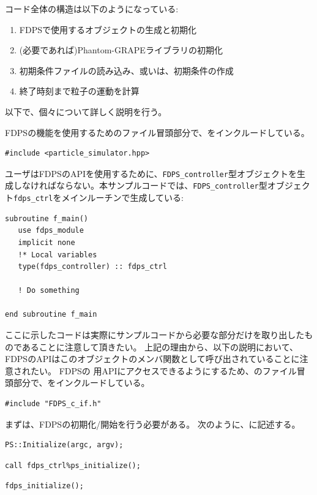 コード全体の構造は以下のようになっている:
\begin{enumerate}[leftmargin=*,itemsep=-1ex,label=(\arabic*)]
\item FDPSで使用するオブジェクトの生成と初期化
\item (必要であれば)Phantom-GRAPEライブラリの初期化
\item 初期条件ファイルの読み込み、或いは、初期条件の作成
\item 終了時刻まで粒子の運動を計算
\end{enumerate}

以下で、個々について詳しく説明を行う。

\ifCpp %
FDPSの機能を使用するためのファイル冒頭部分で、をインクルードしている。
\begin{lstlisting}[caption=FDPSのヘッダーファイルのインクルード]
#include <particle_simulator.hpp>
\end{lstlisting}
\endifCpp
\ifFtn %
ユーザはFDPSのAPIを使用するために、\texttt{FDPS\_controller}型オブジェクトを生成しなければならない。本サンプルコードでは、\texttt{FDPS\_controller}型オブジェクト\texttt{fdps\_ctrl}をメインルーチンで生成している:
\begin{lstlisting}[caption=\texttt{fdps\_controller}型オブジェクトの生成]
subroutine f_main()
   use fdps_module
   implicit none
   !* Local variables
   type(fdps_controller) :: fdps_ctrl
    
   ! Do something
   
end subroutine f_main    
\end{lstlisting}
ここに示したコードは実際にサンプルコードから必要な部分だけを取り出したものであることに注意して頂きたい。
上記の理由から、以下の説明において、FDPSのAPIはこのオブジェクトのメンバ関数として呼び出されていることに注意されたい。
\endifFtn
\ifC %
FDPSの \progLangName 用APIにアクセスできるようにするため、\fileNameOfMainFunc のファイル冒頭部分で、をインクルードしている。
\begin{lstlisting}[caption=FDPSの \progLangName 用APIのヘッダーファイルのインクルード]
#include "FDPS_c_if.h"
\end{lstlisting}
\endifC


まずは、FDPSの初期化/開始を行う必要がある。
次のように、\mainFunc に記述する。
\ifCpp %
\begin{lstlisting}[caption=FDPSの開始]
PS::Initialize(argc, argv);
\end{lstlisting}
\endifCpp
\ifFtn %
\begin{lstlisting}[caption=FDPSの開始]
call fdps_ctrl%ps_initialize();
\end{lstlisting}
\endifFtn
\ifC %
\begin{lstlisting}[caption=FDPSの開始]
fdps_initialize();
\end{lstlisting}
\endifC


